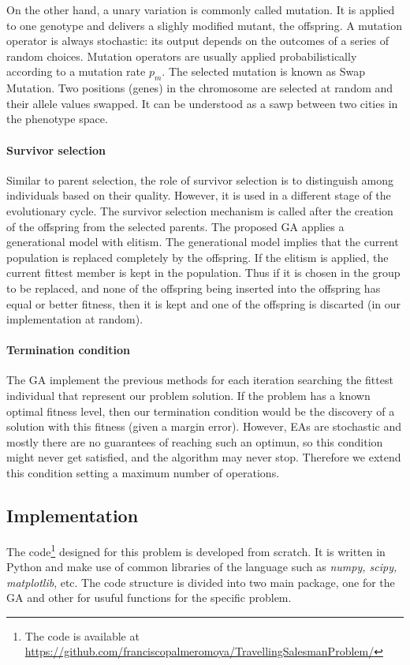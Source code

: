 \documentclass[10pt,a4paper]{article}
\begin{document}
On the other hand, a unary variation is commonly called mutation. It is applied to one genotype and delivers a slighly modified mutant, the offspring. A mutation operator is always stochastic: its output depends on the outcomes of a series of random choices. Mutation operators are usually applied probabilistically according to a mutation rate $p_m$. The selected mutation is known as Swap Mutation. Two positions (genes) in the chromosome are selected at random and their allele values swapped. It can be understood as a sawp between two cities in the phenotype space.

\paragraph*{Survivor selection}
Similar to parent selection, the role of survivor selection is to distinguish among individuals based on their quality. However, it is used in a different stage of the evolutionary cycle. The survivor selection mechanism is called after the creation of the offspring from the selected parents. The proposed GA applies a generational model with elitism. The generational model implies that the current population is replaced completely by the offspring. If the elitism is applied, the current fittest member is kept in the population. Thus if it is chosen in the group to be replaced, and none of the offspring being inserted into the offspring has equal or better fitness, then it is kept and one of the offspring is discarted (in our implementation at random).

\paragraph*{Termination condition}
The GA implement the previous methods for each iteration searching the fittest individual that represent our problem solution. If the problem has a known optimal fitness level, then our termination condition would be the discovery of a solution with this fitness (given a margin error). However, EAs are stochastic and mostly there are no guarantees of reaching such an optimun, so this condition might never get satisfied, and the algorithm may never stop. Therefore we extend this condition setting a maximum number of operations.

\subsection{Implementation}
The code\footnote{The code is available at \url{https://github.com/franciscopalmeromoya/TravellingSalesmanProblem/}} designed for this problem is developed from scratch. It is written in Python and make use of common libraries of the language such as \textit{numpy, scipy, matplotlib}, etc. The code structure is divided into two main package, one for the GA and other for usuful functions for the specific problem.
\end{document}
